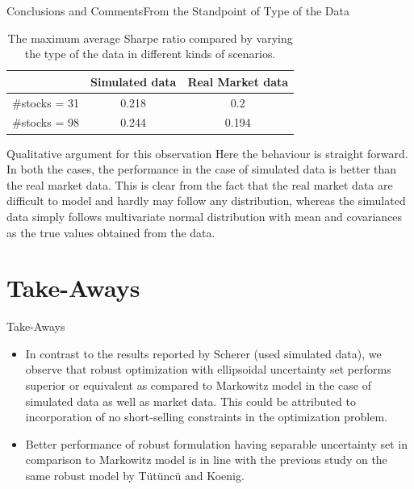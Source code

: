 \documentclass{beamer}
\begin{document}
\begin{frame}{Conclusions and Comments}{From the Standpoint of Type of the Data}
\begin{table}[!h]
    \centering
    \small
    \captionsetup{justification=centering}
   \begin{tabular}{||c|c|c||}
   \hline
  & Simulated data & Real Market data \\
  \hline
  \#stocks = 31  & 0.218    &0.2\\
 \#stocks = 98 &   0.244  & 0.194  \\
 \hline
\end{tabular}
    \caption{The maximum average Sharpe ratio compared by varying the type of the data in different kinds of scenarios.}
    \label{tab:data_type}
\end{table}
\begin{block}{Qualitative argument for this observation}
Here the behaviour is straight forward. In both the cases, the performance in the case of simulated data is better than the real market data. This is clear from the fact that the real market data are difficult to model and hardly may follow any distribution, whereas the simulated data simply follows multivariate normal distribution with mean and covariances as the true values obtained from the data.
\end{block}
\vfill
\end{frame}



\section{Take-Aways}

\begin{frame}{Take-Aways}

\begin{itemize}
    \item {In contrast to the results reported by Scherer (used simulated data), we observe that robust optimization with ellipsoidal uncertainty set performs superior or equivalent as compared to Markowitz model in the case of simulated data as well as market data. This could be attributed to incorporation of no short-selling constraints in the optimization problem.  }
    \item {Better performance of robust formulation having separable uncertainty set in comparison to Markowitz model is in line with the previous study on the same robust model by T{\"u}t{\"u}nc{\"u} and Koenig.}
\end{itemize}
    
\end{frame}
\end{document}

